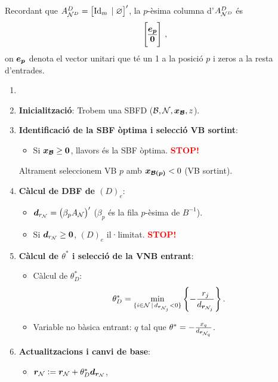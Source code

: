 Recordant que $A^D_{\mathcal{N}^D} = \left[\operatorname{Id}_{m} \;|\; \varnothing \right]'$, la $p$-èsima columna d'$A^D_{\mathcal{N}^D}$ és
\[
	\left[
	\begin{array}{@{}c@{}}
		\vb{e_p}\\
		\hline
		\vb{0}
	\end{array}
	\right]\,,
\]
on $\boldsymbol{e_p}$ denota el vector unitari que té un 1 a la posició $p$ i zeros a la resta d'entrades.

\begin{alg}
    \begin{enumerate}
        \item[]
        \item {\bf Inicialització}: Trobem una SBFD ($\mathcal{B}, \mathcal{N}, \boldsymbol{x_{\mathcal{B}}}, z$).
        \item \label{simp_dual_pas2} {\bf Identificació de la SBF òptima i selecció VB sortint}:
            \begin{itemize}
                \item Si $\boldsymbol{x_{\mathcal{B}}} \geq \boldsymbol{0}$, llavors és la SBF òptima. \textcolor{red}{\bf STOP!}
            \end{itemize}
            Altrament seleccionem VB $p$ amb $\boldsymbol{x_{\mathcal{B}\left(p\right)}} < 0$ (VB sortint).
        \item {\bf Càlcul de DBF de $\left(D\right)_e$}:
            \begin{itemize}
                \item $\boldsymbol{d}_{r_{\mathcal{N}}} = \left(\beta_p A_{\mathcal{N}}\right)^\prime$ ($\beta_p$ és la fila $p$-èsima de $B^{-1}$).
                \item Si $\boldsymbol{d}_{r_{\mathcal{N}}} \geq \boldsymbol{0}$, $\left(D\right)_e$ il·limitat. \textcolor{red}{\bf STOP!}
            \end{itemize}
        \item {\bf Càlcul de $\theta^*$ i selecció de la VNB entrant}:
            \begin{itemize}
                \item Càlcul de $\theta_D^*$: 
                    \[\theta_D^* = \min_{\{i \in \mathcal{N} \,|\, d_{\boldsymbol{r}_{\mathcal{N}_j}} < 0\}} \left\{-\frac{r_j}{d_{\boldsymbol{r}_{\mathcal{N}_j}}} \right\}.\]
                \item Variable no bàsica entrant: $q$ tal que $\theta^* = -\frac{x_q}{d_{\boldsymbol{r}_{\mathcal{N}_q}}}$.
            \end{itemize}
        \item {\bf Actualitzacions i canvi de base}:
            \begin{itemize}
                \item $\boldsymbol{r}_{\mathcal{N}} := \boldsymbol{r}_{\mathcal{N}} + \theta_D^* \boldsymbol{d}_{\boldsymbol{r}_{\mathcal{N}}}$, \\

\end{itemize}
\end{enumerate}
\end{alg}
